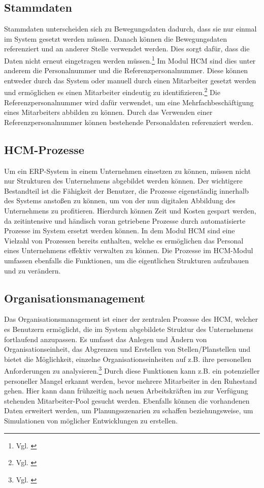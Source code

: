 \subsection{Stammdaten}
Stammdaten unterscheiden sich zu Bewegungsdaten dadurch, dass sie nur einmal im System gesetzt werden müssen. Danach können die Bewegungsdaten referenziert und an anderer Stelle verwendet werden. Dies sorgt dafür, dass die Daten nicht erneut eingetragen werden müssen.\footnote{Vgl. \cite{SSSUM2019a}}
Im Modul HCM sind dies unter anderem die Personalnummer und die Referenzpersonalnummer.
Diese können entweder durch das System oder manuell durch einen Mitarbeiter gesetzt werden und ermöglichen es einen Mitarbeiter eindeutig zu identifizieren.\footnote{Vgl. \cite{SSSUM2019a}}
Die Referenzpersonalnummer wird dafür verwendet, um eine Mehrfachbeschäftigung eines Mitarbeiters abbilden zu können.
Durch das Verwenden einer Referenzpersonalnummer können bestehende Personaldaten referenziert werden.
\subsection{HCM-Prozesse}
Um ein ERP-System in einem Unternehmen einsetzen zu können, müssen nicht nur Strukturen des Unternehmens abgebildet werden können.
Der wichtigere Bestandteil ist die Fähigkeit der Benutzer, die Prozesse eigenständig innerhalb des Systems anstoßen zu können, um von der nun digitalen Abbildung des Unternehmens zu profitieren.
Hierdurch können Zeit und Kosten gespart werden, da zeitintensive und händisch voran getriebene Prozesse durch automatisierte Prozesse im System ersetzt werden können.
In dem Modul HCM sind eine Vielzahl von Prozessen bereits enthalten, welche es ermöglichen das Personal eines Unternehmens effektiv verwalten zu können.
Die Prozesse im HCM-Modul umfassen ebenfalls die Funktionen, um die eigentlichen Strukturen aufzubauen und zu verändern.

\subsection{Organisationsmanagement}
Das Organisationsmanagement ist einer der zentralen Prozesse des HCM, welcher es Benutzern ermöglicht, die im System abgebildete Struktur des Unternehmens fortlaufend anzupassen.
Es umfasst das Anlegen und Ändern von Organisationseinheit, das Abgrenzen und Erstellen von Stellen/Planstellen und bietet die Möglichkeit, einzelne Organisationseinheiten auf z.B. ihre personellen Anforderungen zu analysieren.\footnote{Vgl. \cite{SSSUM2019a}}
Durch diese Funktionen kann z.B. ein potenzieller personeller Mangel erkannt werden, bevor mehrere Mitarbeiter in den Ruhestand gehen. Hier kann dann frühzeitig nach neuen Arbeitskräften im zur Verfügung stehenden Mitarbeiter-Pool gesucht werden.
Ebenfalls können die vorhandenen Daten erweitert werden, um Planungsszenarien zu schaffen beziehungsweise, um Simulationen von möglicher Entwicklungen zu erstellen.

